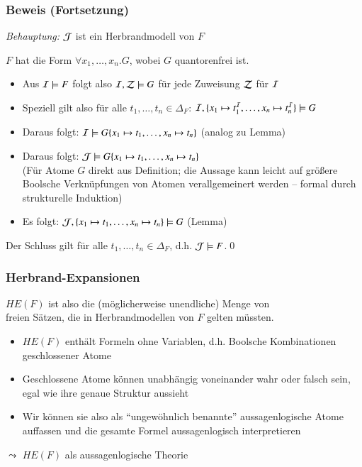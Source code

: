 \documentclass[aspectratio=1610,onlymath]{beamer}
\begin{document}
\begin{frame}\frametitle{Beweis (Fortsetzung)}

\emph{Behauptung:} \alert{$\mathcal{J}$ ist ein Herbrandmodell von $F$}\bigskip

$F$ hat die Form $\forall x_1,\ldots, x_n.G$, wobei $G$ quantorenfrei ist.\pause
\begin{itemize}
\item Aus $\mathcal{I}\models F$ folgt also $\mathcal{I},\mathcal{Z}\models G$ für jede Zuweisung $\mathcal{Z}$ für $\mathcal{I}$\pause
\item Speziell gilt also für alle $t_1,\ldots,t_n\in\Delta_F$: $\mathcal{I},\{x_1\mapsto t_1^{\mathcal{I}},\ldots,x_n\mapsto t_n^{\mathcal{I}}\}\models G$\pause
\item Daraus folgt: $\mathcal{I}\models G\{x_1\mapsto t_1,\ldots,x_n\mapsto t_n\}$  (analog zu Lemma)\pause
\item Daraus folgt: $\mathcal{J}\models G\{x_1\mapsto t_1,\ldots,x_n\mapsto t_n\}$\\
{\footnotesize(Für Atome $G$ direkt aus Definition; die Aussage kann leicht auf größere Boolsche Verknüpfungen von Atomen verallgemeinert werden -- formal durch strukturelle Induktion)}\pause
\item Es folgt: $\mathcal{J},\{x_1\mapsto t_1,\ldots,x_n\mapsto t_n\}\models G$ (Lemma)
\end{itemize}
Der Schluss gilt für alle $t_1,\ldots,t_n\in\Delta_F$, d.h. $\mathcal{J}\models F$.\qed

\end{frame}



\begin{frame}\frametitle{Herbrand-Expansionen}


$HE(F)$ ist also die (möglicherweise unendliche) Menge von \\ freien Sätzen, die in Herbrandmodellen von $F$ gelten müssten.
\pause\bigskip

\begin{itemize}
\item $HE(F)$ enthält Formeln ohne Variablen, d.h. Boolsche Kombinationen geschlossener Atome
\item Geschlossene Atome können unabhängig voneinander wahr oder falsch sein, egal wie ihre genaue Struktur aussieht
\item Wir können sie also als "`ungewöhnlich benannte"' aussagenlogische Atome auffassen und die gesamte Formel aussagenlogisch interpretieren
\end{itemize}
\alert{$\leadsto$ $HE(F)$ als aussagenlogische Theorie}


\end{frame}
\end{document}
